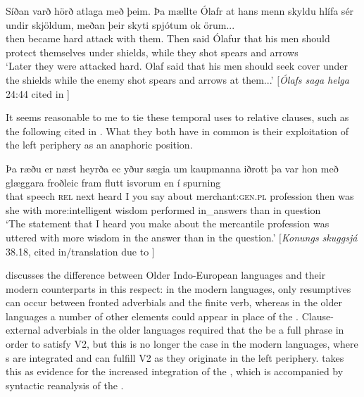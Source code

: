 \documentclass[output=paper,colorlinks,citecolor=brown]{langscibook}
\begin{document}
\ea\label{ex:atlaga}
\gll Síðan varð hörð atlaga með þeim. Þa mællte Ólafr at hans menn skyldu hlífa sér undir skjöldum, meðan þeir skyti spjótum ok örum... \\
then became hard attack with them. Then said Ólafur that his men should protect themselves under shields, while they shot spears and arrows\\
\glt `Later they were attacked hard. Olaf said that his men should seek cover under the shields while the enemy shot spears and arrows at them...' \hfill $[$\textit{Ólafs saga helga} 24:44 cited in \citeauthor{nilsen2020adverbial} \citeyear[28]{nilsen2020adverbial}]
\z

It seems reasonable to me to tie these temporal  uses to  relative clauses, such as the following cited in \citet[229]{Wagener2017}. What they both have in common is their exploitation of the left periphery as an anaphoric position.

\ea\label{ex:raedu}
    \gll Þa ræðu er næst heyrða ec yður sægia um kaupmanna iðrott þa var hon með glæggara froðleic fram flutt isvorum en í spurning \\
    that speech \textsc{rel} next heard I you say about merchant:\textsc{gen.pl} profession then was she with more:intelligent wisdom performed {} in\_answers than in question\\
\glt `The statement that I heard you make about the mercantile profession was uttered with more wisdom in the answer than in the question.' \hfill $[$\textit{Konungs skuggsjá} 38.18, cited in/translation due to \citeauthor{Wagener2017}]
\z

\citet[29]{nilsen2020adverbial} discusses the difference between Older Indo-European languages and their modern counterparts in this respect: in the modern languages, only resumptives can occur between fronted adverbials and the finite verb, whereas in the older languages a number of other elements could appear in place of the . Clause-external adverbials in the older languages required that the  be a full phrase in order to satisfy V2, but this is no longer the case in the modern languages, where s are integrated and can fulfill V2 as they originate in the left periphery. \citet{nilsen2020adverbial} takes this as evidence for the increased integration of the , which is accompanied by syntactic reanalysis of the . 
\end{document}
